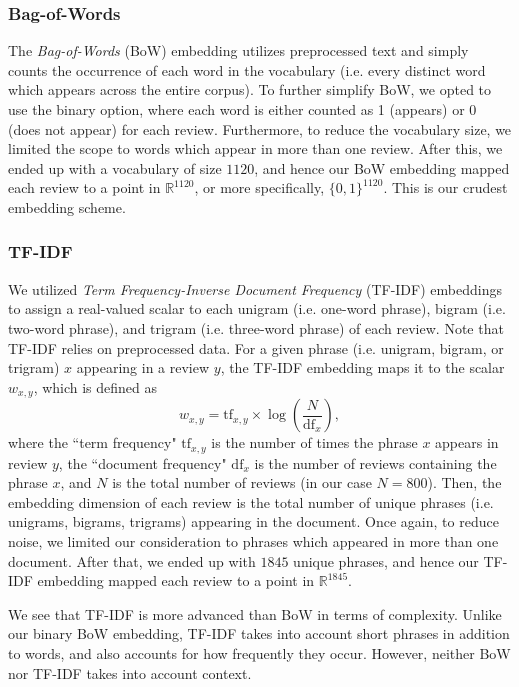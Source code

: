 \documentclass[fleqn,10pt]{SelfArx}
\begin{document}
\subsubsection{Bag-of-Words}
The \textit{Bag-of-Words} (BoW) embedding utilizes preprocessed text and simply counts the occurrence of each word in the vocabulary (i.e. every distinct word which appears across the entire corpus). To further simplify BoW, we opted to use the binary option, where each word is either counted as 1 (appears) or 0 (does not appear) for each review. Furthermore, to reduce the vocabulary size, we limited the scope to words which appear in more than one review. After this, we ended up with a vocabulary of size $1120$, and hence our BoW embedding mapped each review to a point in $\mathbb{R}^{1120}$, or more specifically, $\{0,1\}^{1120}$. This is our crudest embedding scheme. 

\subsubsection{TF-IDF}
We utilized \textit{Term Frequency-Inverse Document Frequency} (TF-IDF) embeddings to assign a real-valued scalar to each unigram (i.e. one-word phrase), bigram (i.e. two-word phrase), and trigram (i.e. three-word phrase) of each review. Note that TF-IDF relies on preprocessed data. For a given phrase (i.e. unigram, bigram, or trigram) $x$ appearing in a review $y$, the TF-IDF embedding maps it to the scalar $w_{x,y}$, which is defined as
$$
    w_{x,y} = \textrm{tf}_{x,y} \times \log\left(\frac{N}{\textrm{df}_x}\right),
$$
where the ``term frequency" $\textrm{tf}_{x,y}$ is the number of times the phrase $x$ appears in review $y$, the ``document frequency" $\textrm{df}_{x}$ is the number of reviews containing the phrase $x$, and $N$ is the total number of reviews (in our case $N=800$). Then, the embedding dimension of each review is the total number of unique phrases (i.e. unigrams, bigrams, trigrams) appearing in the document. Once again, to reduce noise, we limited our consideration to phrases which appeared in more than one document. After that, we ended up with $1845$ unique phrases, and hence our TF-IDF embedding mapped each review to a point in $\mathbb{R}^{1845}$.

We see that TF-IDF is more advanced than BoW in terms of complexity. Unlike our binary BoW embedding, TF-IDF takes into account short phrases in addition to words, and also accounts for how frequently they occur. However, neither BoW nor TF-IDF takes into account context.
\end{document}

